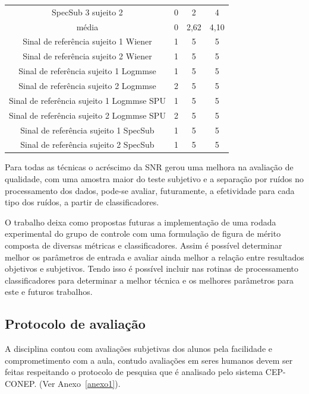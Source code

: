 \begin{table}[H]
\begin{tabular}{cccc}
SpecSub 3 sujeito       2 & 0 & 2 & 4 \\
média & 0 & 2,62 & 4,10 \\
Sinal de referência sujeito 1 Wiener & 1 & 5 & 5 \\
Sinal de referência sujeito 2 Wiener & 1 & 5 & 5 \\
Sinal de referência sujeito 1 Logmmse & 1 & 5 & 5 \\
Sinal de referência sujeito 2 Logmmse & 2 & 5 & 5 \\
Sinal de referência sujeito 1 Logmmse SPU & 1 & 5 & 5 \\
Sinal de referência sujeito 2 Logmmse SPU & 2 & 5 & 5 \\
Sinal de referência sujeito 1 SpecSub & 1 & 5 & 5 \\
Sinal de referência sujeito 2 SpecSub & 1 & 5 & 5 \\

\end{tabular}
\end{table}

Para todas as técnicas o acréscimo da SNR gerou uma melhora na avaliação de qualidade, com uma amostra maior do teste subjetivo e a separação por ruídos no processamento dos dados, pode-se avaliar, futuramente, a efetividade para cada tipo dos ruídos, a partir de classificadores.

O trabalho deixa como propostas futuras a implementação de uma rodada experimental do grupo de controle com uma formulação de figura de mérito composta de diversas métricas e classificadores. Assim é possível determinar melhor os parâmetros de entrada e avaliar ainda melhor a relação entre resultados objetivos e subjetivos. Tendo isso é possível incluir nas rotinas de processamento classificadores para determinar a melhor técnica e os melhores parâmetros para este e futuros trabalhos.

\subsection{Protocolo de avaliação}
A disciplina contou com avaliações subjetivas dos alunos pela facilidade e comprometimento com a aula, contudo avaliações em seres humanos devem ser feitas respeitando o protocolo de pesquisa que é analisado pelo sistema CEP-CONEP. (Ver Anexo~\ref{anexo1}).

